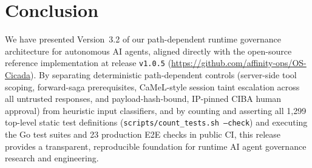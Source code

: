 \documentclass[11pt, a4paper]{article}
\begin{document}
\section{Conclusion}
\label{sec:conclusion}

We have presented Version~3.2 of our path-dependent runtime governance architecture for autonomous AI agents, aligned directly with the open-source reference implementation at release \texttt{v1.0.5} (\url{https://github.com/affinity-ops/OS-Cicada}). By separating deterministic path-dependent controls (server-side tool scoping, forward-saga prerequisites, CaMeL-style session taint escalation across all untrusted responses, and payload-hash-bound, IP-pinned CIBA human approval) from heuristic input classifiers, and by counting and asserting all 1,299 top-level static test definitions (\texttt{scripts/count\_tests.sh --check}) and executing the Go test suites and 23 production E2E checks in public CI, this release provides a transparent, reproducible foundation for runtime AI agent governance research and engineering.
\end{document}
